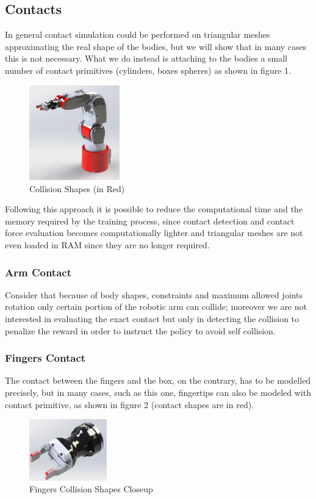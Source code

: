 \documentclass{sig-alternate-05-2015}
\begin{document}
\subsection{Contacts}
In general contact simulation could be performed on triangular meshes approximating the real shape of the bodies, but we will show that in many cases this is not necessary. What we do instead is attaching to the bodies a small number of contact primitives (cylinders, boxes spheres) as shown in figure 1.
\begin{figure}[ht] \label{ConShapes}
\centering
\includegraphics[width=0.35\textwidth]{Figures/CollShapes.JPG}
\caption{Collision Shapes (in Red)}
\end{figure}

Following this approach it is possible to reduce the computational time and the memory required by the training process, since contact detection and contact force evaluation becomes computationally lighter and triangular meshes are not even loaded in RAM since they are no longer required.

\subsubsection{Arm Contact}
Consider that because of body shapes, constraints and maximum allowed joints rotation only certain portion of the robotic arm can collide; moreover we are not interested in evaluating the exact contact but only in detecting the collision to penalize the reward in order to instruct the policy to avoid self collision.
\subsubsection{Fingers Contact}
The contact between the fingers and the box, on the contrary, has to be modelled precisely, but in many cases, such as this one, fingertips can also be modeled with contact primitive, as shown in figure 2 (contact shapes are in red).

\begin{figure} \label{FingerCS}
\centering
\includegraphics[width=0.3\textwidth]{Figures/Finger_CS.JPG}
\caption{Fingers Collision Shapes Closeup}
\end{figure}
\end{document}
